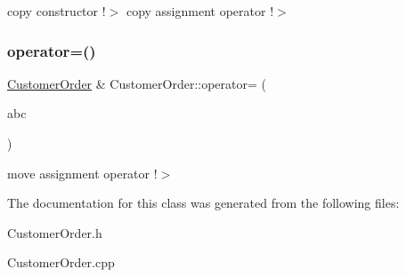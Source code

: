 copy constructor !$>$ copy assignment operator !$>$ \mbox{\label{class_customer_order_a87630720d86454abf4b6c66983415e76}} 
\subsubsection{\texorpdfstring{operator=()}{operator=()}\hspace{0.1cm}{\footnotesize\ttfamily [2/2]}}
{\footnotesize\ttfamily \mbox{\hyperlink{class_customer_order}{Customer\+Order}} \& Customer\+Order\+::operator= (\begin{DoxyParamCaption}\item[{\mbox{\hyperlink{class_customer_order}{Customer\+Order}} \&\&}]{abc }\end{DoxyParamCaption})}

move assignment operator !$>$ 

The documentation for this class was generated from the following files\+:\begin{DoxyCompactItemize}
\item 
Customer\+Order.\+h\item 
Customer\+Order.\+cpp\end{DoxyCompactItemize}
